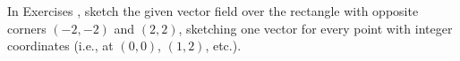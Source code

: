 {\noindent In Exercises}
{, sketch the given vector field over the rectangle with opposite corners $(-2,-2)$ and $(2,2)$, sketching one vector for every point with integer coordinates (i.e., at $(0,0)$, $(1,2)$, etc.).}
